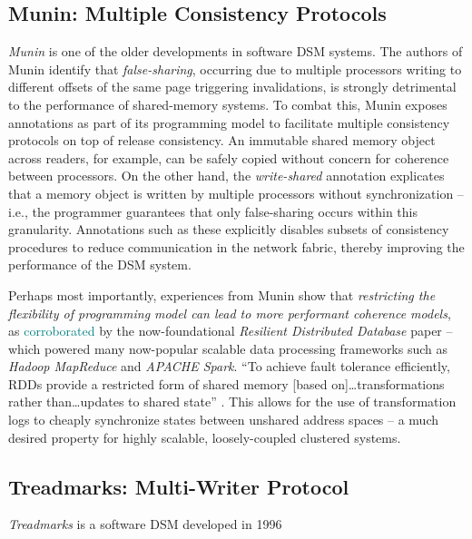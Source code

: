\documentclass{article}
\begin{document}

\subsection{Munin: Multiple Consistency Protocols}
\textit{Munin}\cite{Carter_Bennett_Zwaenepoel.Munin.1991} is one of the older
developments in software DSM systems. The authors of Munin identify that
\textit{false-sharing}, occurring due to multiple processors writing to different
offsets of the same page triggering invalidations, is strongly detrimental to the
performance of shared-memory systems. To combat this, Munin exposes annotations
as part of its programming model to facilitate multiple consistency protocols on
top of release consistency. An immutable shared memory object across readers,
for example, can be safely copied without concern for coherence between processors.
On the other hand, the \textit{write-shared} annotation explicates that a memory
object is written by multiple processors without synchronization -- i.e., the
programmer guarantees that only false-sharing occurs within this granularity.
Annotations such as these explicitly disables subsets of consistency procedures
to reduce communication in the network fabric, thereby improving the performance
of the DSM system.

Perhaps most importantly, experiences from Munin show that \emph{restricting the
flexibility of programming model can lead to more performant coherence models}, as
\textcolor{teal}{corroborated} by the now-foundational
\textit{Resilient Distributed Database} paper \cite{Zaharia_etal.RDD.2012} --
which powered many now-popular scalable data processing frameworks such as
\textit{Hadoop MapReduce}\cite{WEB.APACHE..Apache_Hadoop.2023} and
\textit{APACHE Spark}\cite{WEB.APACHE..Apache_Spark.2023}. ``To achieve fault
tolerance efficiently, RDDs provide a restricted form of shared memory
[based on]\dots transformations rather than\dots updates to shared state''
\cite{Zaharia_etal.RDD.2012}. This allows for the use of transformation logs to
cheaply synchronize states between unshared address spaces -- a much desired
property for highly scalable, loosely-coupled clustered systems.

\subsection{Treadmarks: Multi-Writer Protocol}
\textit{Treadmarks}\cite{Amza_etal.Treadmarks.1996} is a software DSM developed in
1996
\end{document}
